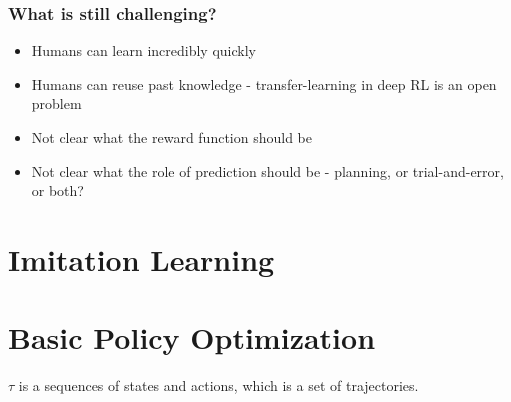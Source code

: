 \documentclass[11pt]{article} %
\begin{document}
\subsubsection{What is still challenging?}
\begin{itemize}
    \item Humans can learn incredibly quickly 
    \item Humans can reuse past knowledge - transfer-learning in deep RL is an open problem
    \item Not clear what the reward function should be
    \item Not clear what the role of prediction should be - planning, or trial-and-error, or both?
\end{itemize}

\section{Imitation Learning}

\section{Basic Policy Optimization}
$\tau$ is a sequences of states and actions, which is a set of trajectories.

\newpage


\end{document}
